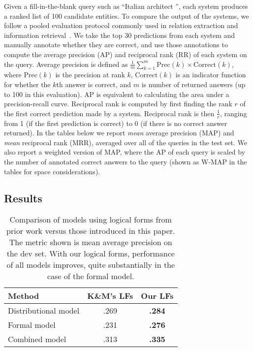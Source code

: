 \documentclass[11pt]{article}
\newcommand{\blank}{\underline{\hspace{.5cm}}}
\begin{document}
Given a fill-in-the-blank query such as ``Italian architect
\blank{}'', each system produces a ranked list of 100 candidate
entities.  To compare the output of the systems, we follow a pooled
evaluation protocol commonly used in relation extraction and
information
retrieval~\cite{west-2014-kbc-via-qa,riedel-2013-mf-universal-schema}.
We take the top 30 predictions from each system and manually annotate
whether they are correct, and use those annotations to compute the
average precision (AP) and reciprocal rank (RR) of each system on the
query.  Average precision is defined as $\frac{1}{m}\sum^m_{k=1}
\mathrm{Prec}(k) \times \mathrm{Correct}(k)$, where $\mathrm{Prec}(k)$
is the precision at rank $k$, $\mathrm{Correct}(k)$ is an indicator
function for whether the $k$th answer is correct, and $m$ is number of
returned answers (up to 100 in this evaluation).  AP is equivalent to
calculating the area under a precision-recall curve.  Reciprocal rank
is computed by first finding the rank $r$ of the first correct
prediction made by a system.  Reciprocal rank is then $\frac{1}{r}$,
ranging from 1 (if the first prediction is correct) to 0 (if there is
no correct answer returned).  In the tables below we report
\emph{mean} average precision (MAP) and \emph{mean} reciprocal rank
(MRR), averaged over all of the queries in the test set.  We also
report a weighted version of MAP, where the AP of each query is scaled
by the number of annotated correct answers to the query (shown as
W-MAP in the tables for space considerations).

\subsection{Results}

\begin{table}
  \centering
  {\small
    \begin{tabular}{lcc}
      \toprule
      Method & K\&M's LFs & Our LFs \\
      \midrule
      Distributional model & .269 & \textbf{.284} \\
      \midrule
      Formal model & .231 & \textbf{.276} \\
      \midrule
      Combined model & .313 & \textbf{.335} \\
      \bottomrule
    \end{tabular}
  }
  \caption{Comparison of models using logical forms from prior work
  versus those introduced in this paper.  The metric shown is mean
  average precision on the dev set.  With our logical forms,
  performance of all models improves, quite substantially in the case
  of the formal model.}
  \label{tab:better-lfs}
\end{table}
\end{document}
